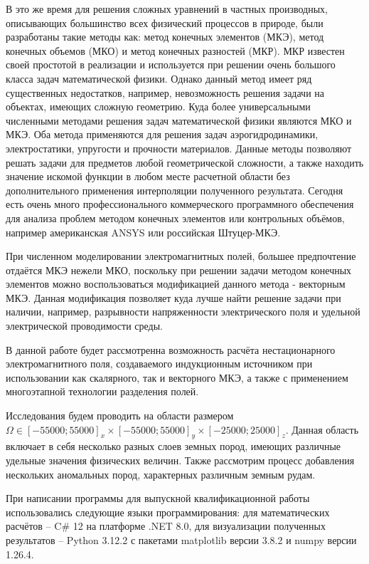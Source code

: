 В это же время для решения сложных уравнений в частных производных, описывающих большинство всех физический процессов в природе, были разработаны такие методы как: метод конечных элементов (МКЭ), метод конечных объемов (МКО) и метод конечных разностей (МКР). МКР известен своей простотой в реализации и используется при решении очень большого класса задач математической физики. Однако данный метод имеет ряд существенных недостатков, например, невозможность решения задачи на объектах, имеющих сложную геометрию. Куда более универсальными численными методами решения задач математической физики являются МКО и МКЭ. Оба метода применяются для решения задач аэрогидродинамики, электростатики, упругости и прочности материалов. Данные методы позволяют решать задачи для предметов любой геометрической сложности, а также находить значение искомой функции в любом месте расчетной области без дополнительного применения интерполяции полученного результата. Сегодня есть очень много профессионального коммерческого программного обеспечения для анализа проблем методом конечных элементов или контрольных объёмов, например американская ANSYS или российская Штуцер-МКЭ.

При численном моделировании электромагнитных полей, большее предпочтение отдаётся МКЭ нежели МКО, поскольку при решении задачи методом конечных элементов можно воспользоваться модификацией данного метода - векторным МКЭ. Данная модификация позволяет куда лучше найти решение задачи при наличии, например, разрывности напряженности электрического поля и удельной электрической проводимости среды.

В данной работе будет рассмотренна возможность расчёта нестационарного электромагнитного поля, создаваемого индукционным источником при использовании как скалярного, так и векторного МКЭ, а также с применением многоэтапной технологии разделения полей.

Исследования будем проводить на области размером $\Omega \in [-55000; 55000]_x \times [-55000; 55000]_y \times [-25000; 25000]_z$. Данная область включает в себя несколько разных слоев земных пород, имеющих различные удельные значения физических величин. Также рассмотрим процесс добавления нескольких аномальных пород, характерных различным земным рудам.

При написании программы для выпускной квалификационной работы использовались следующие языки программирования: для математических расчётов -- C$\#$ 12 на платформе .NET 8.0, для визуализации полученных результатов -- Python 3.12.2 с пакетами matplotlib версии 3.8.2 и numpy версии 1.26.4. 
